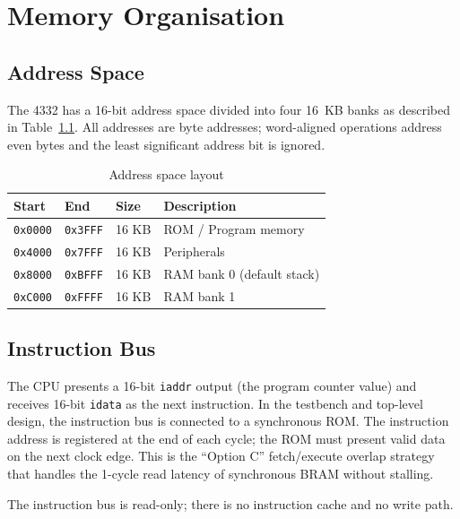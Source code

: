 \documentclass[a4paper,12pt]{report}
\newcommand{\signal}[1]{\texttt{#1}}
\begin{document}
\chapter{Memory Organisation}
\label{ch:memory}

\section{Address Space}

The 4332 has a 16-bit address space divided into four 16~KB banks as described in Table~\ref{tab:addressspace}. All addresses are byte addresses; word-aligned operations address even bytes and the least significant address bit is ignored.

\begin{table}[htbp]
\centering
\caption{Address space layout}
\label{tab:addressspace}
\begin{tabularx}{\textwidth}{lllX}
    \toprule
    \textbf{Start} & \textbf{End} & \textbf{Size} & \textbf{Description} \\
    \midrule
    \texttt{0x0000} & \texttt{0x3FFF} & 16 KB & ROM / Program memory \\
    \texttt{0x4000} & \texttt{0x7FFF} & 16 KB & Peripherals \\
    \texttt{0x8000} & \texttt{0xBFFF} & 16 KB & RAM bank 0 (default stack) \\
    \texttt{0xC000} & \texttt{0xFFFF} & 16 KB & RAM bank 1 \\
    \bottomrule
\end{tabularx}
\end{table}

\section{Instruction Bus}

The CPU presents a 16-bit \signal{iaddr} output (the program counter value) and receives 16-bit \signal{idata} as the next instruction. In the testbench and top-level design, the instruction bus is connected to a synchronous ROM. The instruction address is registered at the end of each cycle; the ROM must present valid data on the next clock edge. This is the ``Option C'' fetch/execute overlap strategy that handles the 1-cycle read latency of synchronous BRAM without stalling.

The instruction bus is read-only; there is no instruction cache and no write path.
\end{document}
